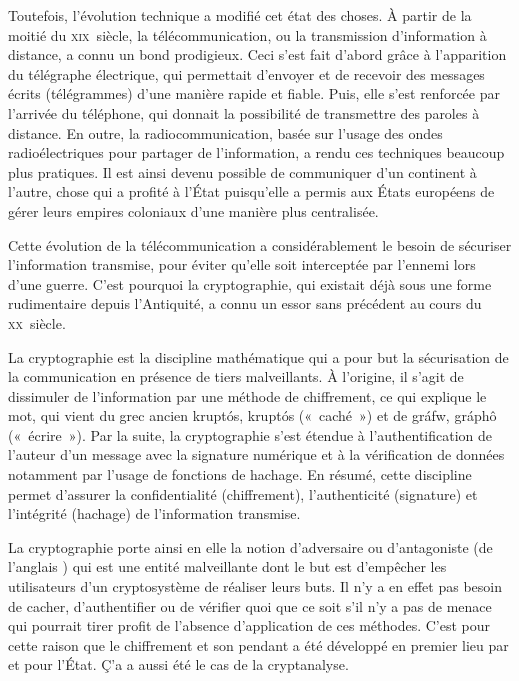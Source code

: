 Toutefois, l'évolution technique a modifié cet état des choses. À partir de la moitié du \textsc{xix}\ieme{}~siècle, la télécommunication, ou la transmission d'information à distance, a connu un bond prodigieux. Ceci s'est fait d'abord grâce à l'apparition du télégraphe électrique, qui permettait d'envoyer et de recevoir des messages écrits (télégrammes) d'une manière rapide et fiable. Puis, elle s'est renforcée par l'arrivée du téléphone, qui donnait la possibilité de transmettre des paroles à distance. En outre, la radiocommunication, basée sur l'usage des ondes radioélectriques pour partager de l'information, a rendu ces techniques beaucoup plus pratiques. Il est ainsi devenu possible de communiquer d'un continent à l'autre, chose qui a profité à l'État puisqu'elle a permis aux États européens de gérer leurs empires coloniaux d'une manière plus centralisée. %

Cette évolution de la télécommunication a considérablement le besoin de sécuriser l'information transmise, pour éviter qu'elle soit interceptée par l'ennemi lors d'une guerre. C'est pourquoi la cryptographie, qui existait déjà sous une forme rudimentaire depuis l'Antiquité, a connu un essor sans précédent au cours du \textsc{xx}\ieme{}~siècle.


La cryptographie est la discipline mathématique qui a pour but la sécurisation de la communication en présence de tiers malveillants. À l'origine, il s'agit de dissimuler de l'information par une méthode de chiffrement, ce qui explique le mot, qui vient du grec ancien \foreignlanguage{greek}{kruptós}, kruptós («~caché~») et de \foreignlanguage{greek}{gráfw}, gráphô («~écrire~»). Par la suite, la cryptographie s'est étendue à l'authentification de l'auteur d'un message avec la signature numérique et à la vérification de données notamment par l'usage de fonctions de hachage. En résumé, cette discipline permet d'assurer la confidentialité (chiffrement), l'authenticité (signature) et l'intégrité (hachage) de l'information transmise.


La cryptographie porte ainsi en elle la notion d'adversaire ou d'antagoniste (de l'anglais ) qui est une entité malveillante dont le but est d'empêcher les utilisateurs d'un cryptosystème de réaliser leurs buts. Il n'y a en effet pas besoin de cacher, d'authentifier ou de vérifier quoi que ce soit s'il n'y a pas de menace qui pourrait tirer profit de l'absence d'application de ces méthodes. C'est pour cette raison que le chiffrement et son pendant a été développé en premier lieu par et pour l'État. Ç'a a aussi été le cas de la cryptanalyse.

